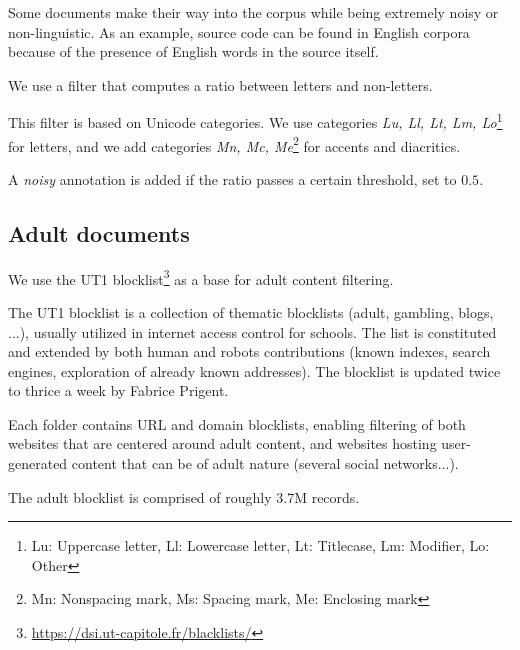 Some documents make their way into the corpus while being extremely noisy or non-linguistic. As an example, source code can be found in English corpora because of the presence of English words in the source itself.

We use a filter that computes a ratio between letters and non-letters.

This filter is based on Unicode categories. We use categories \emph{Lu, Ll, Lt, Lm, Lo}\footnote{Lu: Uppercase letter, Ll: Lowercase letter, Lt: Titlecase, Lm: Modifier, Lo: Other} for letters, and we add categories \emph{Mn, Mc, Me}\footnote{Mn: Nonspacing mark, Ms: Spacing mark, Me: Enclosing mark} for accents and diacritics.

A \emph{noisy} annotation is added if the ratio passes a certain threshold, set to $0.5$.


\subsection{Adult documents}

We use the UT1 blocklist\footnote{\url{https://dsi.ut-capitole.fr/blacklists/}} as a base for adult content filtering.

The UT1 blocklist is a collection of thematic blocklists (adult, gambling, blogs, ...), usually utilized in internet access control for schools. The list is constituted and extended by both human and robots contributions (known indexes, search engines, exploration of already known addresses). The blocklist is updated twice to thrice a week by Fabrice Prigent.

Each folder contains URL and domain blocklists, enabling filtering of both websites that are centered around adult content, and websites hosting user-generated content that can be of adult nature (several social networks...).

The adult blocklist is comprised of roughly 3.7M records.



